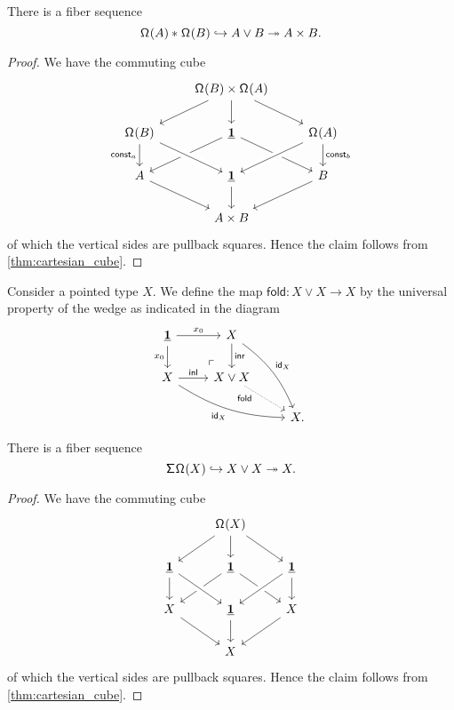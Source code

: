 \begin{prp}
There is a fiber sequence 
\begin{equation*}
{\mathsf{\Omega}^{}(A)}\ast_{}{\mathsf{\Omega}^{}(B)}\hookrightarrow A\vee B\twoheadrightarrow A\times B.
\end{equation*}
\end{prp}

\begin{proof}
We have the commuting cube 
\begin{equation*}
\begin{tikzcd}
& \loopspace{B}\times\loopspace{A} \arrow[dl] \arrow[d] \arrow[dr] \\
\loopspace{B} \arrow[d,swap,"\mathsf{const}_a"] & \unit \arrow[dl] \arrow[dr] & \loopspace{A} \arrow[dl,crossing over] \arrow[d,"\mathsf{const}_b"] \\
A \arrow[dr] & \unit \arrow[from=ul,crossing over] \arrow[d] & B \arrow[dl] \\
& A\times B
\end{tikzcd}
\end{equation*}
of which the vertical sides are pullback squares. Hence the claim follows from \cref{thm:cartesian_cube}.
\end{proof}

\begin{defn}
Consider a pointed type $X$. We define the map $\mathsf{fold}:X\vee X\to X$ by the universal property of the wedge as indicated in the diagram
\begin{equation*}
\begin{tikzcd}
\unit \arrow[d,swap,"x_0"] \arrow[r,"x_0"] \arrow[dr, phantom, "\ulcorner", very near end] & X \arrow[d,"\inr"] \arrow[ddr,bend left=15,"{\idfunc[X]}"] \\
X \arrow[r,"\inl"] \arrow[drr,bend right=15,swap,"{\idfunc[X]}"] & X\vee X \arrow[dr,densely dotted,near start,swap,"\mathsf{fold}"] \\
& & X.
\end{tikzcd}
\end{equation*}
\end{defn}

\begin{prp}
There is a fiber sequence
\begin{equation*}
\mathsf{\Sigma}^{}\mathsf{\Omega}^{}(X) \hookrightarrow X\vee X \twoheadrightarrow X.
\end{equation*}
\end{prp}

\begin{proof}
We have the commuting cube 
\begin{equation*}
\begin{tikzcd}
& \loopspace{X} \arrow[dl] \arrow[d] \arrow[dr] \\
\unit \arrow[d] & \unit \arrow[dl] \arrow[dr] & \unit \arrow[dl,crossing over] \arrow[d] \\
X \arrow[dr] & \unit \arrow[from=ul,crossing over] \arrow[d] & X \arrow[dl] \\
& X
\end{tikzcd}
\end{equation*}
of which the vertical sides are pullback squares. Hence the claim follows from \cref{thm:cartesian_cube}.
\end{proof}


